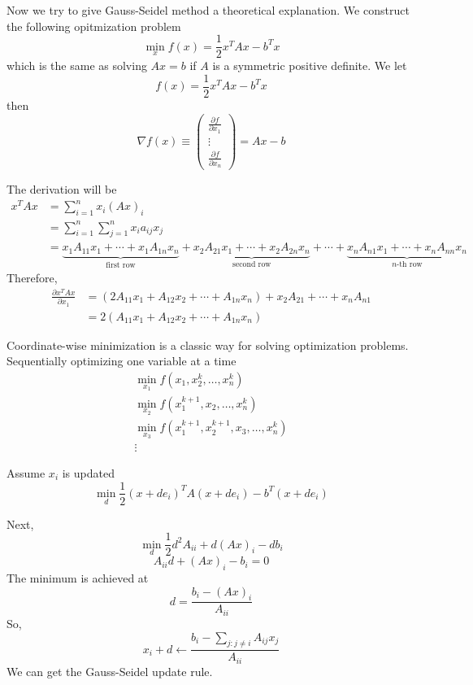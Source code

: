 Now we try to give Gauss-Seidel method a theoretical explanation. We construct the following opitmization problem \[
    \min_{x} f(x) = \frac{1}{2} x^T A x - b^T x
\]
which is the same as solving $Ax = b$ if $A$ is a symmetric positive definite. We let \[
    f(x) = \frac{1}{2} x^T A x - b^T x
\]
then \[
    \nabla f(x) \equiv \begin{pmatrix}
        \frac{\partial f}{\partial x_1} \\
        \vdots \\
        \frac{\partial f}{\partial x_n}
    \end{pmatrix} = Ax - b
\]

The derivation will be \begin{align*}
    x^T A x &= \sum_{i=1}^n x_i (Ax)_i \\[3pt]
    &= \sum_{i=1}^n \sum_{j=1}^n x_i a_{ij} x_j \\[3pt]
    &= \underbrace{x_1  A_{11} x_1 + \cdots + x_1 A_{1n} x_n}_{\text{first row}} + \underbrace{x_2 A_{21} x_1 + \cdots + x_2 A_{2n} x_n}_{\text{second row}} + \cdots + \underbrace{x_n A_{n1} x_1 + \cdots + x_n A_{nn} x_n}_{n\text{-th row}}
\end{align*}
Therefore, \begin{align*}
    \frac{\partial x^T A x}{\partial x_1} &= (2 A_{11} x_1 + A_{12} x_2 + \cdots + A_{1n} x_n) + x_2 A_{21} + \cdots + x_n A_{n1} \\[3pt]
    &= 2 (A_{11} x_1 + A_{12} x_2 + \cdots + A_{1n} x_n) \tag{since $A$ is symmetric}
\end{align*}

\begin{note}
    Coordinate-wise minimization is a classic way for solving optimization problems. Sequentially optimizing one variable at a time \begin{gather*}
        \min_{x_1} f(x_1, x^k_2, \ldots, x^k_n)\\
        \min_{x_2} f(x^{k+1}_1, x_2, \ldots, x^k_n)\\
        \min_{x_3} f(x^{k+1}_1, x^{k+1}_2, x_3, \ldots, x^k_n)\\
        \vdots
  \end{gather*}
\end{note}

Assume $x_i$ is updated \[
    \min_{d} \frac{1}{2} (x + d e_i)^T A (x + d e_i) - b^T (x + d e_i)
\]

Next, \[
    \min_{d} \frac{1}{2} d^2 A_{ii} + d (Ax)_i - d b_i
\]
\[
    A_{ii} d + (Ax)_i - b_i = 0
\]
The minimum is achieved at \[
    d = \frac{b_i - (Ax)_i}{A_{ii}}
\]
So, \[
    x_i + d \leftarrow \frac{b_i - \sum_{j:j \neq i} A_{ij} x_j}{A_{ii}}
\]
We can get the Gauss-Seidel update rule.

